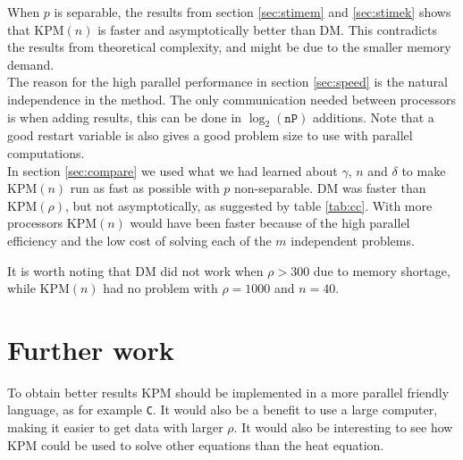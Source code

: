 When $p$ is separable, the results from section \ref{sec:stimem} and \ref{sec:stimek} shows that KPM$(n)$ is faster and asymptotically better than DM. This contradicts the results from theoretical complexity, and might be due to the smaller memory demand. \\


The reason for the high parallel performance in section \ref{sec:speed} is the natural independence in the method. The only communication needed between processors is when adding results, this can be done in $\log_2(\texttt{nP})$ additions. Note that a good restart variable is also gives a good problem size to use with parallel computations. \\

In section \ref{sec:compare} we used what we had learned about $\gamma$, $n$ and $\delta$ to make KPM$(n)$ run as fast as possible with $p$ non-separable. DM was faster than KPM$(\rho)$, but not asymptotically, as suggested by table \ref{tab:cc}. With more processors KPM$(n)$ would have been faster because of the high parallel efficiency and the low cost of solving each of the $m$ independent problems.

It is worth noting that DM did not work when $\rho>300$ due to memory shortage, while KPM$(n)$ had no problem with $\rho = 1000$ and $n = 40$. \\




\chapter*{Further work}%
To obtain better results KPM should be implemented in a more parallel friendly language, as for example \texttt{C}. It would also be a benefit to use a large computer, making it easier to get data with larger $\rho$.
It would also be interesting to see how KPM could be used to solve other equations than the heat equation.
